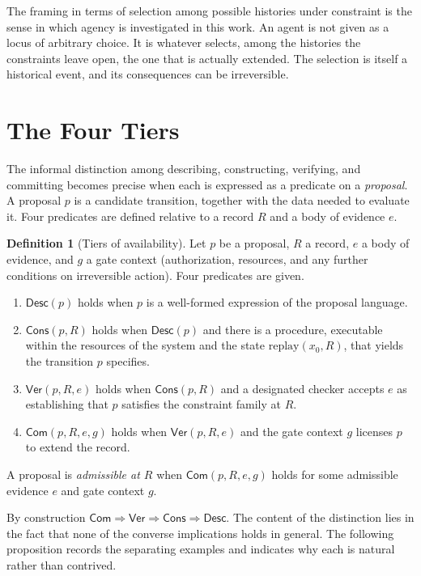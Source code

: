 \documentclass[11pt,twoside,openright]{book}
\theoremstyle{plain}
\theoremstyle{definition}
\newtheorem{definition}[theorem]{Definition}
\theoremstyle{remark}
\newcommand{\Desc}{\mathsf{Desc}}
\newcommand{\Cons}{\mathsf{Cons}}
\newcommand{\Ver}{\mathsf{Ver}}
\newcommand{\Com}{\mathsf{Com}}
\newcommand{\replay}{\mathrm{replay}}
\begin{document}
The framing in terms of selection among possible histories under constraint is the sense in which agency is investigated in this work. An agent is not given as a locus of arbitrary choice. It is whatever selects, among the histories the constraints leave open, the one that is actually extended. The selection is itself a historical event, and its consequences can be irreversible.

\section{The Four Tiers}

The informal distinction among describing, constructing, verifying, and committing becomes precise when each is expressed as a predicate on a \emph{proposal}. A proposal $p$ is a candidate transition, together with the data needed to evaluate it. Four predicates are defined relative to a record $R$ and a body of evidence $e$.

\begin{definition}[Tiers of availability]\label{def:tiers}
Let $p$ be a proposal, $R$ a record, $e$ a body of evidence, and $g$ a gate context (authorization, resources, and any further conditions on irreversible action). Four predicates are given.
\begin{enumerate}
\item[] $\Desc(p)$ holds when $p$ is a well-formed expression of the proposal language.
\item[] $\Cons(p,R)$ holds when $\Desc(p)$ and there is a procedure, executable within the resources of the system and the state $\replay(x_0,R)$, that yields the transition $p$ specifies.
\item[] $\Ver(p,R,e)$ holds when $\Cons(p,R)$ and a designated checker accepts $e$ as establishing that $p$ satisfies the constraint family at $R$.
\item[] $\Com(p,R,e,g)$ holds when $\Ver(p,R,e)$ and the gate context $g$ licenses $p$ to extend the record.
\end{enumerate}
A proposal is \emph{admissible at $R$} when $\Com(p,R,e,g)$ holds for some admissible evidence $e$ and gate context $g$.
\end{definition}

By construction $\Com\Rightarrow\Ver\Rightarrow\Cons\Rightarrow\Desc$. The content of the distinction lies in the fact that none of the converse implications holds in general. The following proposition records the separating examples and indicates why each is natural rather than contrived.
\end{document}
